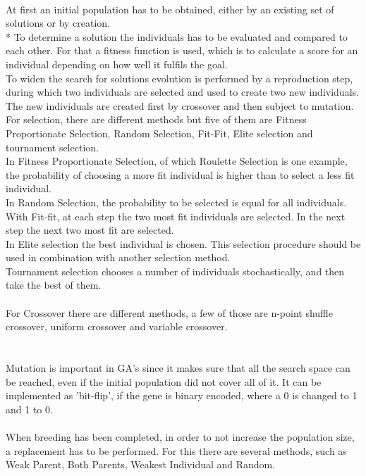 \\At first an initial population has to be obtained, either by an existing set of solutions or by creation.\\*
To determine a solution the individuals has to be evaluated and compared to each other. For that a fitness function is used, which is to calculate a score for an individual depending on how well it fulfils the goal.\\
To widen the search for solutions evolution is performed by a reproduction step, during which two individuals are selected and used to create two new individuals. The new individuals are created first by crossover and then subject to mutation.\\
For selection, there are different methods but five of them are Fitness Proportionate Selection, Random Selection, Fit-Fit, Elite selection and tournament selection.\\
In Fitness Proportionate Selection, of which Roulette Selection is one example, the probability of choosing a more fit individual is higher than to select a less fit individual.\\
In Random Selection, the probability to be selected is equal for all individuals. \\
With Fit-fit, at each step the two most fit individuals are selected. In the next step the next two most fit are selected.\\
In Elite selection the best individual is chosen. This selection procedure should be used in combination with another selection method.\\
Tournament selection chooses a number of individuals stochastically, and then take the best of them.\\
\\
For Crossover there are different methods, a few of those are n-point shuffle crossover, uniform crossover and variable crossover.\\
\\
\\Mutation is important in GA's since it makes sure that all the search space can be reached, even if the initial population did not cover all of it. It can be implemented as 'bit-flip', if the gene is binary encoded, where a 0 is changed to 1 and 1 to 0.\\
\\
When breeding has been completed, in order to not increase the population size, a replacement has to be performed. For this there are several methods, such as Weak Parent, Both Parents, Weakest Individual and Random.\\
